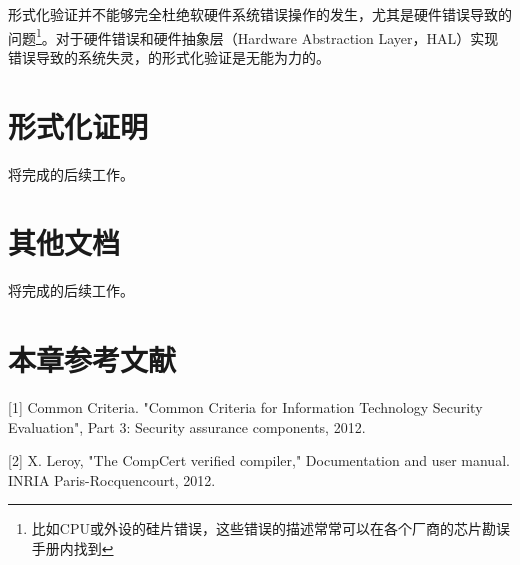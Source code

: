 形式化验证并不能够完全杜绝软硬件系统错误操作的发生，尤其是硬件错误导致的问题\footnote{比如CPU或外设的硅片错误，这些错误的描述常常可以在各个厂商的芯片勘误手册内找到}。对于硬件错误和硬件抽象层（Hardware
Abstraction
Layer，HAL）实现错误导致的系统失灵，的形式化验证是无能为力的。

\section{形式化证明}\label{sec:formal-proof}

将完成的后续工作。

\section{其他文档}\label{sec:other-documents}

将完成的后续工作。

\section{本章参考文献}\label{sec:chapter-bibliography-7}

\protect{}\label{sec:chapter-bibliography-8}{[}1{]}
Common Criteria. "Common Criteria for Information Technology Security
Evaluation", Part 3: Security assurance components, 2012.

{[}2{]} X. Leroy, "The CompCert verified compiler," Documentation and
user manual. INRIA Paris-Rocquencourt, 2012.
